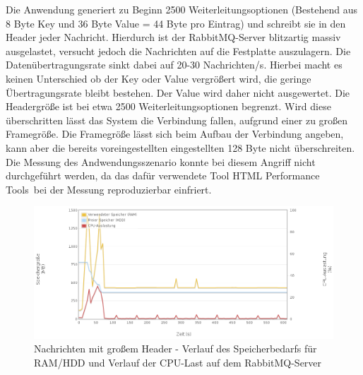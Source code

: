 \documentclass[	a4paper,
			11pt,
			oneside,
			parskip]{scrartcl}
\begin{document}
	
	\clearpage
		{%
		  \newline
		  \newline
		  \newline
		}{%
		 Die Anwendung generiert zu Beginn 2500 Weiterleitungsoptionen (Bestehend aus 8 Byte Key und 36 Byte Value = 44 Byte pro Eintrag) und schreibt sie in den Header jeder Nachricht. Hierdurch ist der
		 RabbitMQ-Server blitzartig massiv ausgelastet, versucht jedoch die Nachrichten auf die Festplatte auszulagern. Die Datenübertragungsrate sinkt dabei auf 20-30 Nachrichten/s. Hierbei macht es
		 keinen Unterschied ob der Key oder Value vergrößert wird, die geringe Übertragungsrate bleibt bestehen. Der Value wird daher nicht ausgewertet. Die Headergröße ist bei etwa 2500
		 Weiterleitungsoptionen begrenzt. Wird diese überschritten lässt das System die Verbindung fallen, aufgrund einer zu großen Framegröße. Die Framegröße lässt sich beim Aufbau der
		 Verbindung angeben, kann aber die bereits voreingestellten eingestellten 128 Byte nicht überschreiten.
		}{%
		 Die Messung des Andwendungsszenario konnte bei diesem Angriff nicht durchgeführt werden, da das dafür verwendete Tool \glqq HTML Performance Tools\grqq\ bei der Messung reproduzierbar einfriert.
		}

		\begin{figure}[!htb]
			\centering
			\includegraphics[width=\textwidth]{img/header/header_server1.png}
			\caption{Nachrichten mit großem Header - Verlauf des Speicherbedarfs für RAM/HDD und Verlauf der CPU-Last auf dem RabbitMQ-Server}
			\label{fig:header-server1}
		\end{figure}
		
\end{document}
